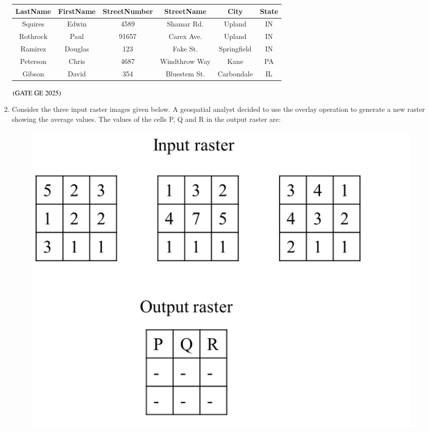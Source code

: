 \documentclass[journal,12pt,onecolumn]{IEEEtran}
\theoremstyle{remark}
\begin{document}
\begin{enumerate}
\begin{table}[h]
\centering
\begin{tabular}{|c|c|c|c|c|c|}
\hline
LastName & FirstName & StreetNumber & StreetName & City & State \\
\hline
Squires & Edwin & 4589 & Shamar Rd. & Upland & IN \\
Rothrock & Paul & 91657 & Carex Ave. & Upland & IN \\
Ramirez & Douglas & 123 & Fake St. & Springfield & IN \\
Peterson & Chris & 4687 & Windthrow Way & Kane & PA \\
Gibson & David & 354 & Bluestem St. & Carbondale & IL \\
\hline
\end{tabular}
\end{table}
\begin{enumerate}
\end{enumerate}
\hfill $\left(\text{GATE GE 2025}\right)$
\bigskip
\item Consider the three input raster images given below. A geospatial analyst decided to use the overlay operation to generate a new raster showing the average values. The values of the cells P, Q and R in the output raster are:
\begin{figure}[H]
    \centering
    \includegraphics[width=0.4\columnwidth]{figs/fig10.png}
    \caption{}
    \label{figs:fig10}
\end{figure}


\end{enumerate}
\end{document}
